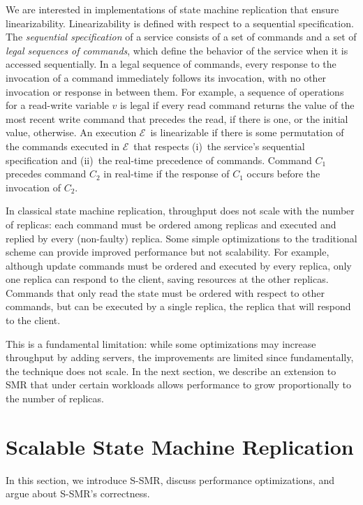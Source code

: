 \documentclass[11pt]{article}
\newcommand{\ex}{$\mathcal{E}$}
\begin{document}
We are interested in implementations of state machine replication that ensure linearizability.
%
Linearizability is defined with respect to a sequential specification.
The \emph{sequential specification} of a service consists of a set of commands and a set of \emph{legal sequences of commands}, which define the behavior of the service when it is accessed sequentially.
In a legal sequence of commands, every response to the invocation of a command immediately follows its invocation, with no other invocation or response in between them.
For example, a sequence of operations for a read-write variable $v$ is legal if every read command returns the value of the most recent write command that precedes the read, if there is one, or the initial value, otherwise.
An execution \ex\ is linearizable if there is some permutation of the commands executed in \ex\ that respects (i)~the service's sequential specification and (ii)~the real-time precedence of commands.
Command $C_1$ precedes command $C_2$ in real-time if the response of $C_1$ occurs before the invocation of $C_2$.

In classical state machine replication, throughput does not scale with the number of replicas: each command must be ordered among replicas and executed and replied by every (non-faulty) replica.
Some simple optimizations to the traditional scheme can provide improved performance but not scalability.
For example, although update commands must be ordered and executed by every replica, only one replica can respond to the client, saving resources at the other replicas.
Commands that only read the state must be ordered with respect to other commands, but can be executed by a single replica, the replica that will respond to the client.

This is a fundamental limitation: while some optimizations may increase throughput by adding servers, the improvements are limited since fundamentally, the technique does not scale.
In the next section, we describe an extension to SMR that under certain workloads allows performance to grow proportionally to the number of replicas.



\section{Scalable State Machine Replication}
\label{sec:scalablesmr}

In this section, we introduce S-SMR, discuss performance optimizations, and argue about S-SMR's correctness.
\end{document}
